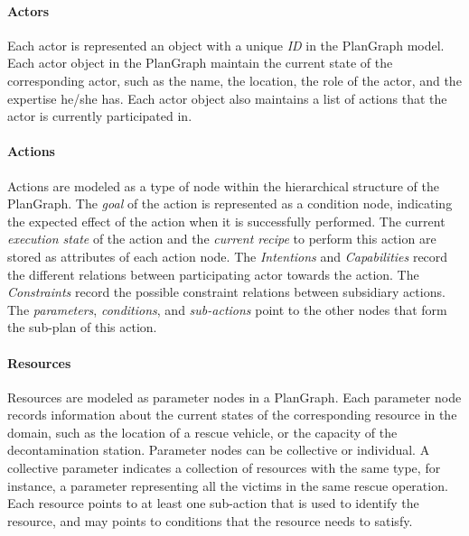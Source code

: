 
\paragraph*{Actors} %
\label{par:actors_in_plangraph}
Each actor is represented an object with a unique \emph{ID} in the PlanGraph model. Each actor object in the PlanGraph maintain the current state of the corresponding actor, such as the name, the location, the role of the actor, and the expertise he/she has. Each actor object also maintains a list of actions that the actor is currently participated in.

\paragraph*{Actions} %
\label{par:actions_in_plangraph}
Actions are modeled as a type of node within the hierarchical structure of the PlanGraph. The \emph{goal} of the action is represented as a condition node, indicating the expected effect of the action when it is successfully performed. The current \emph{execution state} of the action and the \emph{current recipe} to perform this action are stored as attributes of each action node. The \emph{Intentions} and \emph{Capabilities} record the different relations between participating actor towards the action. The \emph{Constraints} record the possible constraint relations between subsidiary actions. The \emph{parameters}, \emph{conditions}, and \emph{sub-actions} point to the other nodes that form the sub-plan of this action.

 \paragraph*{Resources} %
 \label{par:resources_in_plangraph}
Resources are modeled as parameter nodes in a PlanGraph. Each parameter node records information about the current states of the corresponding resource in the domain, such as the location of a rescue vehicle, or the capacity of the decontamination station. Parameter nodes can be collective or individual. A collective parameter indicates a collection of resources with the same type, for instance, a parameter representing all the victims in the same rescue operation. Each resource points to at least one sub-action that is used to identify the resource, and may points to conditions that the resource needs to satisfy.

